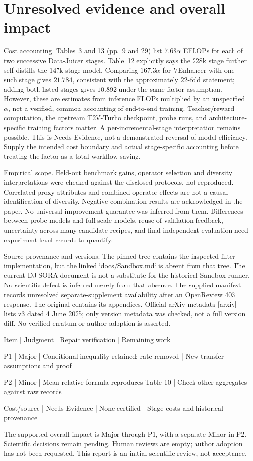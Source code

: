 \documentclass[10pt]{article}
\begin{document}
\section*{Unresolved evidence and overall impact}
Cost accounting. Tables 3 and 13 (pp. 9 and 29) list \(7.68\alpha\) EFLOPs for each of two successive Data-Juicer stages. Table 12 explicitly says the 228k stage further self-distills the 147k-stage model. Comparing \(167.3\alpha\) for VEnhancer with one such stage gives \(21.784\), consistent with the approximately \(22\)-fold statement; adding both listed stages gives \(10.892\) under the same-factor assumption. However, these are estimates from inference FLOPs multiplied by an unspecified \(\alpha\), not a verified, common accounting of end-to-end training. Teacher/reward computation, the upstream T2V-Turbo checkpoint, probe runs, and architecture-specific training factors matter. A per-incremental-stage interpretation remains possible. This is Needs Evidence, not a demonstrated reversal of model efficiency. Supply the intended cost boundary and actual stage-specific accounting before treating the factor as a total workflow saving.\par
Empirical scope. Held-out benchmark gains, operator selection and diversity interpretations were checked against the disclosed protocols, not reproduced. Correlated proxy attributes and combined-operator effects are not a causal identification of diversity. Negative combination results are acknowledged in the paper. No universal improvement guarantee was inferred from them. Differences between probe models and full-scale models, reuse of validation feedback, uncertainty across many candidate recipes, and final independent evaluation need experiment-level records to quantify.\par
Source provenance and versions. The pinned tree contains the inspected filter implementation, but the linked `docs/Sandbox.md` is absent from that tree. The current DJ-SORA document is not a substitute for the historical Sandbox runner. No scientific defect is inferred merely from that absence. The supplied manifest records unresolved separate-supplement availability after an OpenReview 403 response. The original contains its appendices. Official arXiv metadata [arxiv] lists v3 dated 4 June 2025; only version metadata was checked, not a full version diff. No verified erratum or author adoption is asserted.\par
Item | Judgment | Repair verification | Remaining work\par
P1 | Major | Conditional inequality retained; rate removed | New transfer assumptions and proof\par
P2 | Minor | Mean-relative formula reproduces Table 10 | Check other aggregates against raw records\par
Cost/source | Needs Evidence | None certified | Stage costs and historical provenance\par
The supported overall impact is Major through P1, with a separate Minor in P2. Scientific decisions remain pending. Human reviews are empty; author adoption has not been requested. This report is an initial scientific review, not acceptance.\par
\end{document}
